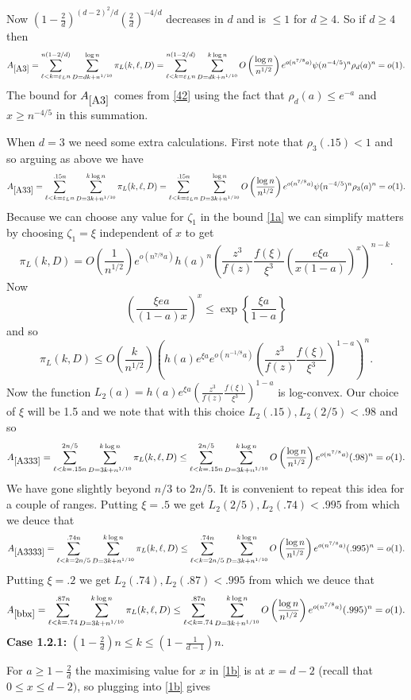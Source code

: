 \documentclass[11pt]{article}
\def\e{\varepsilon}
\def\z{\zeta}
\def\p{\pi}
\def\r{\rho}
\newcommand{\set}[1]{\left\{#1\right\}}
\newcommand{\brac}[1]{\left(#1\right)}
\newcommand{\bfrac}[2]{\brac{\frac{#1}{#2}}}
\newcommand{\beq}[1]{\begin{equation}\label{#1}}
\newcommand{\eeq}{\end{equation}}
\begin{document}
Now
$\brac{1-\frac{2}{d}}^{(d-2)^2/d}\bfrac{2}{d}^{-4/d}$ decreases in $d$ and is $\le 1$ for $d\ge 4$.
So if $d\geq 4$ then
\beq{A3}
A_{\ref{A3}}=\sum_{\ell<k=\e_Ln}^{n(1-2/d)}\sum_{D=dk+n^{1/10}}^{\log n}\p_L(k,\ell,D)=
\sum_{\ell<k=\e_Ln}^{n(1-2/d)}\sum_{D=dk+n^{1/10}}^{k\log n}
O\bfrac{\log n}{n^{1/2}}e^{o(n^{7/8}a)}\psi(n^{-4/5})^n\r_d(a)^n=o(1).
\eeq
The bound for $A_{\ref{A3}}$ comes from \eqref{42} using the fact that $\r_d(a)\leq e^{-a}$ and $x\geq n^{-4/5}$ in this summation. 

When $d=3$ we need some extra calculations. First note that $\r_3(.15)<1$ and so arguing as above we have
\beq{A33}
A_{\ref{A33}}=\sum_{\ell<k=\e_Ln}^{.15n}\sum_{D=3k+n^{1/10}}^{k\log n}\p_L(k,\ell,D)=
\sum_{\ell<k=\e_Ln}^{.15n}\sum_{D=3k+n^{1/10}}^{\log n}O\bfrac{\log n}{n^{1/2}}e^{o(n^{7/8}a)}\psi(n^{-4/5})^n\r_3(a)^n=o(1).
\eeq
Because we can choose any value for $\z_1$ in the bound \eqref{1a} we can simplify matters by choosing $\z_1=\xi$ 
independent of $x$ to get
\beq{1a1a}
\p_L(k,D)=O\bfrac{1}{n^{1/2}}e^{o(n^{7/8}a)}h(a)^{n}
\brac{\frac{z^3}{f(z)}\frac{f(\xi)}{\xi^{3}}
\bfrac{e\xi a}{x(1-a)}^x}^{n-k}.
\eeq
Now 
\beq{xxq}
\bfrac{\xi ea}{(1-a)x}^x\leq \exp\set{\frac{\xi a}{1-a}}
\eeq
and so
\beq{are}
\p_L(k,D)\leq O\bfrac{k}{n^{1/2}}\brac{h(a)e^{\xi a}e^{o(n^{-1/8}a)}\brac{\frac{z^3}{f(z)}\frac{f(\xi)}{\xi^3}}^{1-a}}^n.
\eeq
Now the function $L_2(a)=h(a)e^{\xi a}\brac{\frac{z^3}{f(z)}\frac{f(\xi)}{\xi^3}}^{1-a}$ is log-convex. Our choice of
$\xi$ will be 1.5 and we note that with this choice
$L_2(.15),L_2(2/5)<.98$ and so
\beq{A333}
A_{\ref{A333}}=\sum_{\ell<k=.15n}^{2n/5}\sum_{D=3k+n^{1/10}}^{k\log n}\p_L(k,\ell,D)\leq
\sum_{\ell<k=.15n}^{2n/5}\sum_{D=3k+n^{1/10}}^{k\log n}O\bfrac{\log n}{n^{1/2}}e^{o(n^{7/8}a)}(.98)^n=o(1).
\eeq
We have gone slightly beyond $n/3$ to $2n/5$. It is convenient to repeat this idea for a couple of ranges. Putting $\xi=.5$
we get $L_2(2/5),L_2(.74)<.995$ from which we deuce that
\beq{A3333}
A_{\ref{A3333}}=\sum_{\ell<k=2n/5}^{.74n}\sum_{D=3k+n^{1/10}}^{k\log n}\p_L(k,\ell,D)\leq
\sum_{\ell<k=2n/5}^{.74n}\sum_{D=3k+n^{1/10}}^{k\log n}O\bfrac{\log n}{n^{1/2}}e^{o(n^{7/8}a)}(.995)^n=o(1).
\eeq
Putting $\xi=.2$
we get $L_2(.74),L_2(.87)<.995$ from which we deuce that
\beq{bbx}
A_{\ref{bbx}}=\sum_{\ell<k=.74}^{.87n}\sum_{D=3k+n^{1/10}}^{k\log n}\p_L(k,\ell,D)\leq
\sum_{\ell<k=.74}^{.87n}\sum_{D=3k+n^{1/10}}^{k\log n}O\bfrac{\log n}{n^{1/2}}e^{o(n^{7/8}a)}(.995)^n=o(1).
\eeq
{\bf Case 1.2.1:} $\brac{1-\frac{2}{d}}n\leq k\leq \brac{1-\frac{1}{d-1}}n$.

For $a\ge 1-\frac{2}{d}$ the maximising value for $x$ in \eqref{1b} is 
at $x = d-2$ (recall that $0\le x\le d-2)$, so plugging into \eqref{1b} gives
\end{document}
